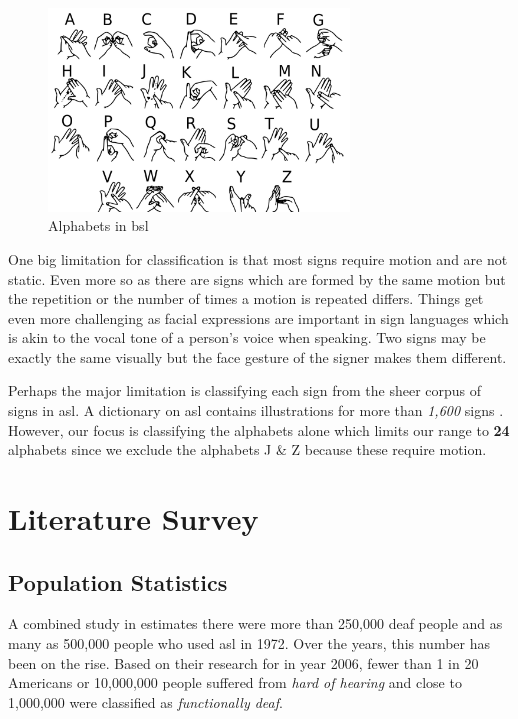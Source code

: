 \documentclass[twocolumn]{article}
\begin{document}
\begin{figure}[h]
\centering
\includegraphics[width=8cm]{./figures/bsl alphabets}
\caption{Alphabets in \gls{bsl}}
\label{bsl alphabets}
\end{figure}

One big limitation for classification is that most signs require motion and 
are not static. Even more so as there are signs which are formed by the same 
motion but the repetition or the number of times a motion is repeated differs. 
Things get even more challenging as facial expressions are important in sign 
languages which is akin to the vocal tone of a person's voice when speaking. 
Two signs may be exactly the same visually but the face gesture of the signer 
makes them different.

Perhaps the major limitation is classifying each sign from the sheer corpus of 
signs in \gls{asl}. A dictionary on \gls{asl} contains illustrations for more 
than \textit{1,600} signs \cite{tennant1998american}. However, our focus is 
classifying the alphabets alone which limits our range to \textbf{24} 
alphabets since we exclude the alphabets J \& Z because these require motion.

\section{Literature Survey}

\subsection{Population Statistics}
A combined study in \cite{mitchell2006many} estimates there were more than 
250,000 deaf people and as many as 500,000 people who used \gls{asl} in 1972. 
Over the years, this number has been on the rise. Based on their research for 
in year 2006, fewer than 1 in 20 Americans or 10,000,000 people suffered from 
\textit{hard of hearing} and close to 1,000,000 were classified as 
\textit{functionally deaf}.
\end{document}

